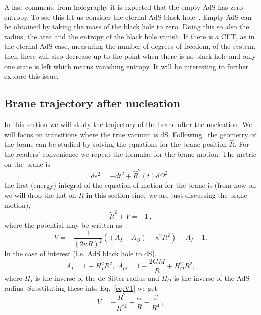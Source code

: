 \documentclass[a4paper,11pt]{article}
\numberwithin{equation}{section}
\numberwithin{equation}{section}
\begin{document}
A last comment; from holography it is expected that the empty AdS has zero entropy.  To see this let us consider the eternal AdS black hole~\cite{Maldacena:2001kr}.   Empty AdS can be obtained by taking the mass of the black hole to zero.  Doing this so also the radius, the area and the entropy of the black hole vanish.  If there is a CFT, as in the eternal AdS case, measuring the number of degrees of freedom, of the system,  then these will also  decrease up to the point when there is no black hole and only one state is left which means vanishing entropy.  It will be interesting to further explore this issue.


\subsection{Brane trajectory after nucleation}
In this section we will study the trajectory of the brane after the nucleation.  We will focus on transitions where the true vacuum is dS.  Following~\cite{Blau:1986cw} the geometry of the brane can be studied by solving the equations for the brane position $\hat{R}$.  For the readers' convenience we repeat the formulae for the brane motion.  The metric on the brane is 
\begin{equation}
ds^{2}=-dt^{2}+\hat{R}^{2}(t)d\Omega^{2} \,.\label{eq:brane-metric}
\end{equation}
the first (energy) integral of the equation of motion for the brane is (from now on we will drop the hat on $R$ in this section
since we are just discussing the brane motion),
\begin{equation}
\dot{R}^{2}+V=-1 \,,\label{eq:brane-eom}
\end{equation}
 where the potential may be written as
\begin{equation}
V=-\frac{1}{\left(2\kappa R\right)^{2}}\left(\left(A_{I}-A_{O}\right)+\kappa^{2}R^{2}\right)+A_{I}-1.\label{eq:V1}
\end{equation}
In the case of interest (i.e. AdS black hole to dS), 
\[
A_{I}=1-H_{I}^{2}R^{2},\,\,A_{O}=1-\frac{2GM}{R}+H_{O}^{2}R^{2},
\]
where $H_{I}$ is the inverse of the de Sitter radius and $H_{O}$
is the inverse of the AdS radius.  Substituting these into Eq.~\eqref{eq:V1} we get
\begin{equation}
V=-\frac{R^{2}}{R^{*2}}+\frac{\alpha}{R}-\frac{\beta}{R^{4}} \,,\label{eq:V2}
\end{equation}
\end{document}
